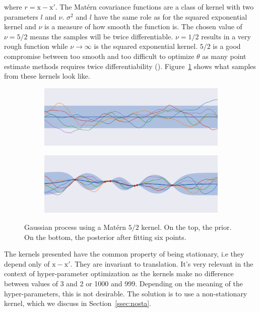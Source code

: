 where $r = \mathrm{x} - \mathrm{x'}$. The Matérn covariance functions are a class of kernel with two parameters $l$ and $\nu$. $\sigma^2$ and $l$ have the same role as for the squared exponential kernel and $\nu$ is a measure of how smooth the function is. The chosen value of $\nu = 5/2$ means the samples will be twice differentiable. $\nu = 1/2$ results in a very rough function while $\nu \to \infty$ is the squared exponential kernel. $5/2$ is a good compromise between too smooth and too difficult to optimize $\theta$ as many point estimate methods requires twice differentiability (\textcite{snoek2012NIPS}). Figure~\ref{fig:gp_matern} shows what samples from these kernels look like.

\begin{figure}[htb]
    \centering
    \begin{subfigure}[b]{\textwidth}
        \includegraphics[width=\textwidth]{img_hyperopt/gp_matern_prior}
    \end{subfigure}

    \begin{subfigure}[b]{\textwidth}
        \includegraphics[width=\textwidth]{img_hyperopt/gp_matern_posterior}
    \end{subfigure}
    \caption{Gaussian process using a Matérn $5/2$ kernel. On the top, the prior. On the bottom, the posterior after fitting six points.}
    \label{fig:gp_matern}
\end{figure}

The kernels presented have the common property of being stationary, i.e they depend only of $\mathrm{x} - \mathrm{x'}$. They are invariant to translation. It's very relevant in the context of hyper-parameter optimization as the kernels make no difference between values of 3 and 2 or 1000 and 999. Depending on the meaning of the hyper-parameters, this is not desirable. The solution is to use a non-stationary kernel, which we discuss in Section~\ref{ssec:nosta}.

